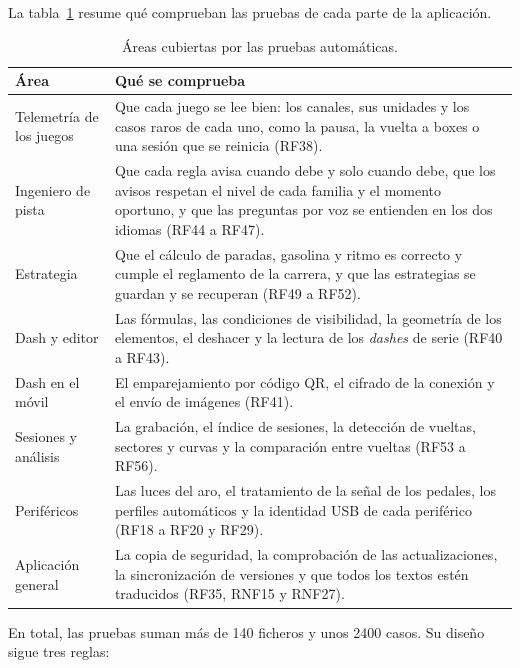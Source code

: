 La tabla~\ref{tab:pruebas-areas} resume qué comprueban las pruebas de cada parte de la aplicación.

\begin{table}[H]
	\centering
	\caption{Áreas cubiertas por las pruebas automáticas.}
	\label{tab:pruebas-areas}
	\small
	\begin{tabularx}{\textwidth}{@{}>{\raggedright\arraybackslash}p{3.6cm}X@{}}
		\toprule
		\textbf{Área} & \textbf{Qué se comprueba} \\
		\midrule
		Telemetría de los juegos & Que cada juego se lee bien: los canales, sus unidades y los casos raros de cada uno, como la pausa, la vuelta a boxes o una sesión que se reinicia (RF38). \\
		Ingeniero de pista & Que cada regla avisa cuando debe y solo cuando debe, que los avisos respetan el nivel de cada familia y el momento oportuno, y que las preguntas por voz se entienden en los dos idiomas (RF44 a RF47). \\
		Estrategia & Que el cálculo de paradas, gasolina y ritmo es correcto y cumple el reglamento de la carrera, y que las estrategias se guardan y se recuperan (RF49 a RF52). \\
		Dash y editor & Las fórmulas, las condiciones de visibilidad, la geometría de los elementos, el deshacer y la lectura de los \textit{dashes} de serie (RF40 a RF43). \\
		Dash en el móvil & El emparejamiento por código QR, el cifrado de la conexión y el envío de imágenes (RF41). \\
		Sesiones y análisis & La grabación, el índice de sesiones, la detección de vueltas, sectores y curvas y la comparación entre vueltas (RF53 a RF56). \\
		Periféricos & Las luces del aro, el tratamiento de la señal de los pedales, los perfiles automáticos y la identidad USB de cada periférico (RF18 a RF20 y RF29). \\
		Aplicación general & La copia de seguridad, la comprobación de las actualizaciones, la sincronización de versiones y que todos los textos estén traducidos (RF35, RNF15 y RNF27). \\
		\bottomrule
	\end{tabularx}
\end{table}

En total, las pruebas suman más de 140 ficheros y unos 2400 casos. Su diseño sigue tres reglas:

